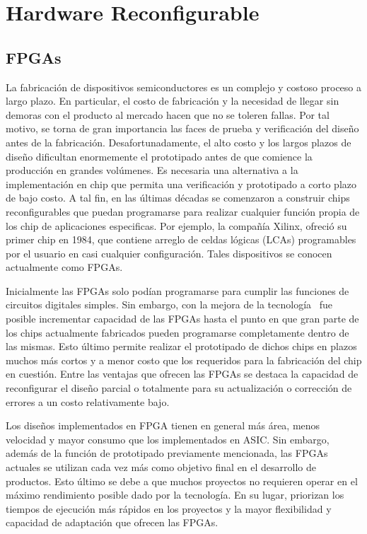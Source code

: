 \chapter{Hardware Reconfigurable}

\section{FPGAs}

La fabricación de dispositivos semiconductores es un complejo y
costoso proceso a largo plazo. En particular, el costo de fabricación
y la necesidad de llegar sin demoras con el producto al mercado hacen
que no se toleren fallas. Por tal motivo, se torna de gran importancia
las faces de prueba y verificación del diseño antes de la
fabricación. Desafortunadamente, el alto costo y los largos plazos de
diseño dificultan enormemente el prototipado antes de que comience la
producción en grandes volúmenes. Es necesaria una alternativa a la
implementación en chip que permita una verificación y prototipado a
corto plazo de bajo costo. A tal fin, en las últimas décadas se comenzaron a
construir chips reconfigurables que puedan programarse para
realizar cualquier función propia de los chip de aplicaciones
especificas. Por ejemplo, la compañía Xilinx, ofreció su primer chip
en 1984, que contiene arreglo de celdas lógicas (LCAs) programables
por el usuario en casi cualquier configuración. Tales dispositivos se
conocen actualmente como FPGAs.%

Inicialmente las FPGAs solo podían programarse para cumplir las
funciones de circuitos digitales simples. Sin embargo, con la mejora
de la tecnología~\cite{Etiqueta02} fue posible incrementar capacidad
de las FPGAs hasta el punto en que gran parte de los chips actualmente
fabricados pueden programarse completamente dentro de las
mismas. Esto último permite realizar el prototipado de dichos chips en
plazos muchos más cortos y a menor costo que los requeridos para la
fabricación del chip en cuestión. Entre las ventajas que ofrecen las
FPGAs se destaca la capacidad de reconfigurar el diseño parcial o
totalmente para su actualización o corrección de errores a un costo
relativamente bajo.

Los diseños implementados en FPGA tienen en general más área, menos
velocidad y mayor consumo que los implementados en ASIC. Sin embargo,
además de la función de prototipado previamente mencionada, las FPGAs
actuales se utilizan cada vez más como objetivo final en
el desarrollo de productos. Esto último se debe a que muchos proyectos
no requieren operar en el máximo rendimiento posible dado por la
tecnología. En su lugar, priorizan los tiempos de ejecución más
rápidos en los proyectos y la mayor flexibilidad y capacidad de adaptación que ofrecen
las FPGAs.

